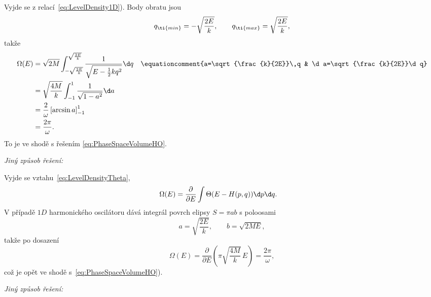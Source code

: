 \begin{solution}
    Vyjde se z relací~\eqref{eq:LevelDensity1D}). 
    Body obratu jsou
    \begin{equation}
        q_{\ti{min}}
            =-\sqrt{\frac{2E}{k}},
            \qquad 
        q_{\ti{max}}
            =\sqrt{\frac{2E}{k}},
    \end{equation}
    takže
    \begin{align}
        \Omega(E)
            &=\sqrt{2M}\int_{-\sqrt{\frac{2E}{k}}}^{\sqrt{\frac{2E}{k}}}\frac{1}{\sqrt{E-\frac{1}{2}kq^{2}}}\d q
            &&\equationcomment{a=\sqrt{\frac{k}{2E}}\,q & \d a=\sqrt{\frac{k}{2E}}\d q}\nonumber\\
            &=\sqrt{\frac{4M}{k}}\int_{-1}^{1}\frac{1}{\sqrt{1-a^{2}}}\d a\nonumber\\
            &=\frac{2}{\omega}\left[\arcsin{a}\right]_{-1}^{1}\nonumber\\
            &=\frac{2\pi}{\omega}.
    \end{align}
    To je ve shodě s řešením \eqref{eq:PhaseSpaceVolumeHO}.
    
    \begin{flushleft}
        \emph{Jiný způsob řešení:} %
    \end{flushleft}
    
    Vyjde se vztahu~\eqref{eq:LevelDensityTheta},
    \begin{align}
        \Omega(E)
            &=\frac{\partial}{\partial E}\int\Theta(E-H(p,q))\d p\d q.
    \end{align}
    V případě $1D$ harmonického oscilátoru dává integrál povrch elipsy $S=\pi a b$ s poloosami 
    \begin{equation}
        a=\sqrt{\frac{2E}{k}},
        \qquad 
        b=\sqrt{2ME},
    \end{equation}
    takže po dosazení
    \begin{equation}
        \Omega(E)
            =\frac{\partial}{\partial E}\left(\pi\sqrt{\frac{4M}{k}}\,E\right)
            =\frac{2\pi}{\omega},
    \end{equation}
    což je opět ve shodě s~\eqref{eq:PhaseSpaceVolumeHO}).
    
    \begin{flushleft}
    \emph{Jiný způsob řešení:} %
    \end{flushleft}
    

\end{solution}
